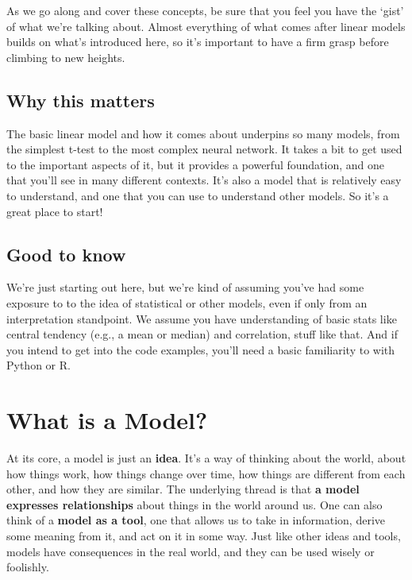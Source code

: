 \documentclass[
  letterpaper,
]{krantz}
\begin{document}
As we go along and cover these concepts, be sure that you feel you have
the `gist' of what we're talking about. Almost everything of what comes
after linear models builds on what's introduced here, so it's important
to have a firm grasp before climbing to new heights.

\subsection{Why this matters}\label{sec-lm-why-this-matters}

The basic linear model and how it comes about underpins so many models,
from the simplest t-test to the most complex neural network. It takes a
bit to get used to the important aspects of it, but it provides a
powerful foundation, and one that you'll see in many different contexts.
It's also a model that is relatively easy to understand, and one that
you can use to understand other models. So it's a great place to start!

\subsection{Good to know}\label{sec-lm-good-to-know}

We're just starting out here, but we're kind of assuming you've had some
exposure to to the idea of statistical or other models, even if only
from an interpretation standpoint. We assume you have understanding of
basic stats like central tendency (e.g., a mean or median) and
correlation, stuff like that. And if you intend to get into the code
examples, you'll need a basic familiarity to with Python or R.

\section{What is a Model?}\label{sec-lm-what-is-a-model}

At its core, a model is just an \textbf{idea}. It's a way of thinking
about the world, about how things work, how things change over time, how
things are different from each other, and how they are similar. The
underlying thread is that \textbf{a model expresses relationships} about
things in the world around us. One can also think of a \textbf{model as
a tool}, one that allows us to take in information, derive some meaning
from it, and act on it in some way. Just like other ideas and tools,
models have consequences in the real world, and they can be used wisely
or foolishly.
\end{document}
